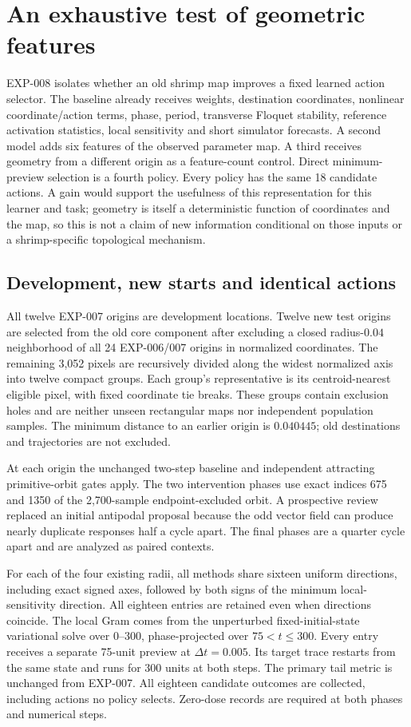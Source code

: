 \section{An exhaustive test of geometric features}
EXP-008 isolates whether an old shrimp map improves a fixed learned action selector. The baseline already receives weights, destination coordinates, nonlinear coordinate/action terms, phase, period, transverse Floquet stability, reference activation statistics, local sensitivity and short simulator forecasts. A second model adds six features of the observed parameter map. A third receives geometry from a different origin as a feature-count control. Direct minimum-preview selection is a fourth policy. Every policy has the same 18 candidate actions. A gain would support the usefulness of this representation for this learner and task; geometry is itself a deterministic function of coordinates and the map, so this is not a claim of new information conditional on those inputs or a shrimp-specific topological mechanism.

\subsection{Development, new starts and identical actions}
All twelve EXP-007 origins are development locations. Twelve new test origins are selected from the old core component after excluding a closed radius-$0.04$ neighborhood of all 24 EXP-006/007 origins in normalized coordinates. The remaining 3,052 pixels are recursively divided along the widest normalized axis into twelve compact groups. Each group's representative is its centroid-nearest eligible pixel, with fixed coordinate tie breaks. These groups contain exclusion holes and are neither unseen rectangular maps nor independent population samples. The minimum distance to an earlier origin is $0.040445$; old destinations and trajectories are not excluded.

At each origin the unchanged two-step baseline and independent attracting primitive-orbit gates apply. The two intervention phases use exact indices 675 and 1350 of the 2,700-sample endpoint-excluded orbit. A prospective review replaced an initial antipodal proposal because the odd vector field can produce nearly duplicate responses half a cycle apart. The final phases are a quarter cycle apart and are analyzed as paired contexts.

For each of the four existing radii, all methods share sixteen uniform directions, including exact signed axes, followed by both signs of the minimum local-sensitivity direction. All eighteen entries are retained even when directions coincide. The local Gram comes from the unperturbed fixed-initial-state variational solve over $0$--$300$, phase-projected over $75<t\le300$. Every entry receives a separate 75-unit preview at $\Delta t=0.005$. Its target trace restarts from the same state and runs for 300 units at both steps. The primary tail metric is unchanged from EXP-007. All eighteen candidate outcomes are collected, including actions no policy selects. Zero-dose records are required at both phases and numerical steps.

